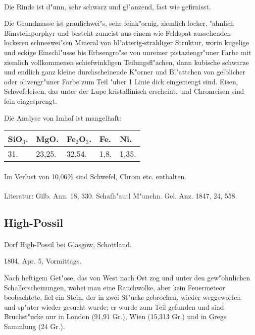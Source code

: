 \documentclass[a4paper, 11pt, oneside]{article}
\begin{document}
\paragraph{}
Die Rinde ist d"unn, sehr schwarz und gl"anzend, fast wie gefirnisst.

Die Grundmasse ist graulichwei"s, sehr feink"ornig, ziemlich locker, "ahnlich Bimsteinporphyr und besteht zumeist aus einem wie Feldspat aussehenden lockeren schneewei"sen Mineral von bl"atterig-strahliger Struktur, worin kugelige und eckige Einschl"usse bis Erbsengro"se von unreiner pistaziengr"uner Farbe mit ziemlich vollkommenen schiefwinkligen Teilungsfl"achen, dann kubische schwarze und endlich ganz kleine durchscheinende K"orner und Bl"attchen von gelblicher oder olivengr"uner Farbe zum Teil "uber 1 Linie dick eingemengt sind. Eisen, Schwefeleisen, das unter der Lupe kristallinisch erscheint, und Chromeisen sind fein eingesprengt.

Die Analyse von Imhof ist mangelhaft:
\begin{table}[!ht]
    \centering
    \begin{tabular}{l l l l l}
        SiO$_{3}$. & MgO. & Fe$_{2}$O$_{3}$. & Fe. & Ni. \\ \hline
        31. & 23,25. & 32,54. & 1,8. & 1,35. \\
    \end{tabular}
\end{table}
\paragraph{}
Im Verlust von 10,06\% sind Schwefel, Chrom etc. enthalten.
\footnotesize
\paragraph{}
Literatur: Gilb. Ann. 18, 330. Schafh"autl M"unchn. Gel. Anz. 1847, 24, 558.
\subsection{High-Possil}
\normalsize
\paragraph{}
Dorf High-Possil bei Glasgow, Schottland.

1804, Apr. 5, Vormittags.

Nach heftigem Get"ose, das von West nach Ost zog und unter den gew"ohnlichen Schallerscheinungen, wobei man eine Rauchwolke, aber kein Feuermeteor beobachtete, fiel ein Stein, der in zwei St"ucke gebrochen, wieder weggeworfen und sp"ater wieder gesucht wurde; er wurde zum Teil gefunden und sind Bruchst"ucke nur in London (91,91 Gr.), Wien (15,313 Gr.) und in Gregs Sammlung (24 Gr.).
\end{document}

